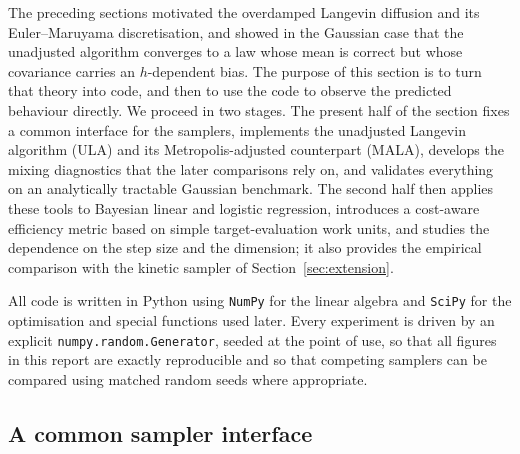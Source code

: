 \documentclass[a4paper,11pt, titlepage]{article}
\theoremstyle{definition}
\theoremstyle{plain}
\theoremstyle{remark}
\begin{document}
The preceding sections motivated the overdamped Langevin diffusion and
its Euler--Maruyama discretisation, and showed in the Gaussian case that
the unadjusted algorithm converges to a law whose mean is correct but
whose covariance carries an $h$-dependent bias. The purpose of this
section is to turn that theory into code, and then to use the code to
observe the predicted behaviour directly. We proceed in two stages.
The present half of the section fixes a common interface for the
samplers, implements the unadjusted Langevin algorithm (ULA) and its
Metropolis-adjusted counterpart (MALA), develops the mixing diagnostics
that the later comparisons rely on, and validates everything on an
analytically tractable Gaussian benchmark. The second half then applies
these tools to Bayesian linear and logistic regression, introduces a
cost-aware efficiency metric based on simple target-evaluation work units, and studies
the dependence on the step size and the dimension; it also provides the
empirical comparison with the kinetic sampler of
Section~\ref{sec:extension}.

All code is written in Python using \texttt{NumPy} for the linear
algebra and \texttt{SciPy} for the optimisation and special functions
used later. Every experiment is driven by an explicit
\texttt{numpy.random.Generator}, seeded at the point of use, so that all
figures in this report are exactly reproducible and so that competing
samplers can be compared using matched random seeds where appropriate.

\subsection{A common sampler interface}
\label{sec:impl-interface}
\end{document}
